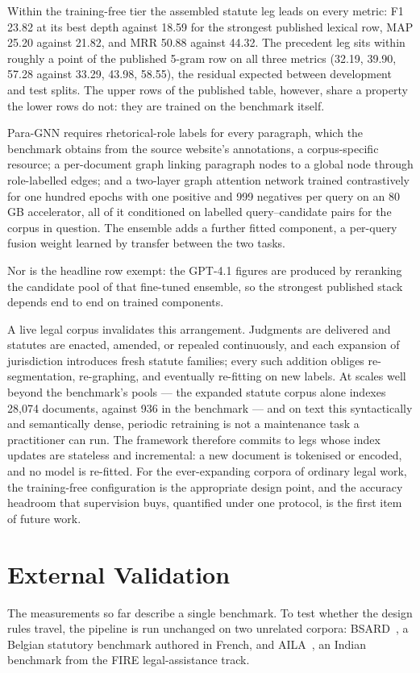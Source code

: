 \documentclass{mnnit}
\begin{document}
Within the training-free tier the assembled statute leg leads on
every metric: F1 23.82 at its best depth against 18.59 for the
strongest published lexical row, MAP 25.20 against 21.82, and
MRR 50.88 against 44.32. The precedent leg sits within roughly a
point of the published 5-gram row on all three metrics (32.19,
39.90, 57.28 against 33.29, 43.98, 58.55), the residual expected
between development and test splits. The upper rows of the
published table, however, share a property the lower rows do
not: they are trained on the benchmark itself.

Para-GNN requires rhetorical-role labels for every paragraph,
which the benchmark obtains from the source website's
annotations, a corpus-specific resource; a per-document graph
linking paragraph nodes to a global node through role-labelled
edges; and a two-layer graph attention network trained
contrastively for one hundred epochs with one positive and 999
negatives per query on an 80\,GB accelerator, all of it
conditioned on labelled query--candidate pairs for the corpus in
question. The ensemble adds a further fitted component, a
per-query fusion weight learned by transfer between the two
tasks.

Nor is the headline row exempt: the GPT-4.1 figures are produced
by reranking the candidate pool of that fine-tuned ensemble, so
the strongest published stack depends end to end on trained
components.

A live legal corpus invalidates this arrangement. Judgments are
delivered and statutes are enacted, amended, or repealed
continuously, and each expansion of jurisdiction introduces
fresh statute families; every such addition obliges
re-segmentation, re-graphing, and eventually re-fitting on new
labels. At scales well beyond the benchmark's pools --- the
expanded statute corpus alone indexes 28,074 documents, against
936 in the benchmark --- and on text this syntactically and
semantically dense, periodic retraining is not a maintenance
task a practitioner can run. The framework therefore commits to
legs whose index updates are stateless and incremental: a new
document is tokenised or encoded, and no model is re-fitted.
For the ever-expanding corpora of ordinary legal work, the
training-free configuration is the appropriate design point,
and the accuracy headroom that supervision buys, quantified
under one protocol, is the first item of future work.

\section{External Validation}
The measurements so far describe a single benchmark. To test
whether the design rules travel, the pipeline is run unchanged
on two unrelated corpora: BSARD~\cite{louis2022bsard}, a Belgian
statutory benchmark authored in French, and AILA~\cite{aila}, an
Indian benchmark from the FIRE legal-assistance track.
\end{document}
